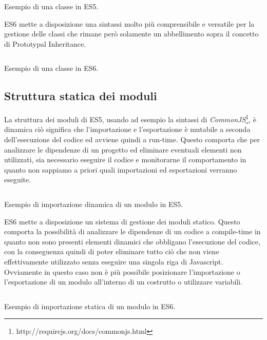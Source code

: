 \begin{listing}[ht]
\inputminted{Javascript}{sources/examplePrototypeInheritanceES5.js}
\caption{Esempio di una classe in ES5.}
\label{examplePrototypeInheritanceES5}
\end{listing}

\noindent
ES6 mette a disposizione una sintassi molto più comprensibile e versatile per la gestione delle classi che rimane però solamente un abbellimento sopra il concetto di Prototypal Inheritance. 

\begin{listing}[ht]
\inputminted{Javascript}{sources/exampleClassES6.js}
\caption{Esempio di una classe in ES6.}
\label{exampleClassES6}
\end{listing}

\subsection{Struttura statica dei moduli}
La struttura dei moduli di ES5, usando ad esempio la sintassi di \textit{CommonJS}\footnote{http://requirejs.org/docs/commonjs.html}, è dinamica ciò significa che l'importazione e l'esportazione è mutabile a seconda dell'esecuzione del codice ed avviene quindi a run-time. Questo comporta che per analizzare le dipendenze di un progetto ed eliminare eventuali elementi non utilizzati, sia necessario eseguire il codice e monitorarne il comportamento in quanto non sappiamo a priori quali importazioni ed esportazioni verranno eseguite.

\begin{listing}[ht]
\inputminted{Javascript}{sources/exampleDynamicImportES5.js}
\caption{Esempio di importazione dinamica di un modulo in ES5.} 
\label{exampleDynamicImportES5}
\end{listing}

\noindent
ES6 mette a disposizione un sistema di gestione dei moduli statico. Questo comporta la possibilità di analizzare le dipendenze di un codice a compile-time in quanto non sono presenti elementi dinamici che obbligano l'esecuzione del codice, con la conseguenza quindi di poter eliminare tutto ciò che non viene effettivamente utilizzato senza eseguire una singola riga di Javascript.
Ovviamente in questo caso non è più possibile posizionare l'importazione o l'esportazione di un modulo all'interno di un costrutto o utilizzare variabili.

\begin{listing}[ht]
\inputminted{Javascript}{sources/exampleImportExportES6.js}
\caption{Esempio di importazione statica di un modulo in ES6.} 
\label{exampleImportExportES6} 
\end{listing}

